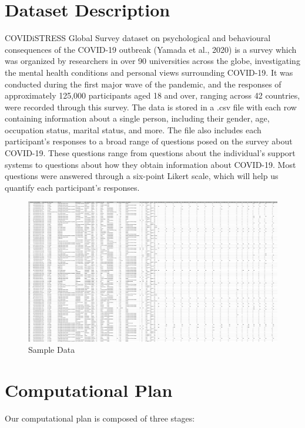 \documentclass[fontsize=11pt]{article}
\begin{document}
    \section*{Dataset Description}

    COVIDiSTRESS Global Survey dataset on psychological and behavioural consequences of the COVID-19 outbreak (Yamada et al., 2020) is a survey which was organized by researchers in over 90 universities across the globe, investigating the mental health conditions and personal views surrounding COVID-19. It was conducted during the first major wave of the pandemic, and the responses of approximately 125,000 participants aged 18 and over, ranging across 42 countries, were recorded through this survey. The data is stored in a .csv file with each row containing information about a single person, including their gender, age, occupation status, marital status, and more. The file also includes each participant's responses to a broad range of questions posed on the survey about COVID-19. These questions range from questions about the individual’s support systems to questions about how they obtain information about COVID-19. Most questions were answered through a six-point Likert scale, which will help us quantify each participant’s responses.

    \begin{figure}
        \centering
        \includegraphics[width=\textwidth]{img/SampleData.png}
        \caption{Sample Data}
        \label{fig:my_label}
    \end{figure}

    \section*{Computational Plan}

    Our computational plan is composed of three stages:
\end{document}

